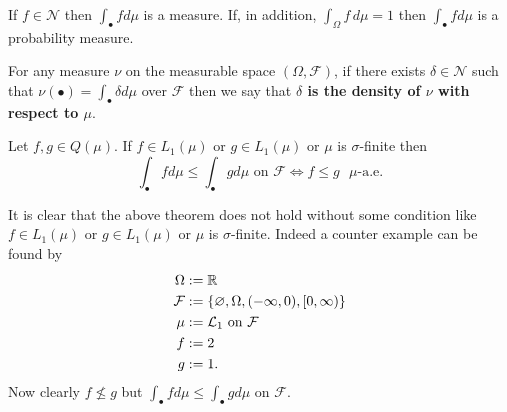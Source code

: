 \begin{corollary} If $f\in \mathscr N$ then $\int_\bullet fd\mu$ is a measure. If, in addition, $\int_\Omega f\,d\mu =1$  then $\int_\bullet fd\mu$ is a probability measure.
\end{corollary}

\begin{definition}[{\bf Densities}]
For any measure $\nu$ on the measurable space $(\Omega, \mathcal F)$, if there exists $\delta\in\mathscr N$  such that $\nu(\bullet)=\int_\bullet \delta d\mu$ over $\mathcal F$
 then we say that {\bf $\delta$ is the density of $\nu$ with respect to $\mu$}.
\end{definition}


\begin{theorem} Let $f,g\in  Q(\mu)$. If $f\in  L_1(\mu)$ or $g\in  L_1(\mu)$ or $\mu$ is $\sigma$-finite then
\[ \text{$\int_\bullet fd\mu\leq \int_\bullet gd\mu$ on $\mathcal F$} \Longleftrightarrow \text{$f\leq g$ $\mu$-a.e}. \]
\end{theorem}
It is clear that the above theorem does not hold without some condition like $f\in  L_1(\mu)$ or $g\in  L_1(\mu)$ or $\mu$ is $\sigma$-finite. Indeed a counter example can be found by
\begin{align*}
\Omega & := \Bbb R \\
\mathcal F &:= \{\varnothing, \Omega, (-\infty, 0), [0,\infty) \} \\
\mu &:= \text{$\mathcal L_1$ on $\mathcal F$}  \\
f&:= 2\\
g&:= 1.
\end{align*}
Now clearly $f\not\leq g$ but $\int_\bullet fd\mu\leq \int_\bullet gd\mu$ on $\mathcal F$.

